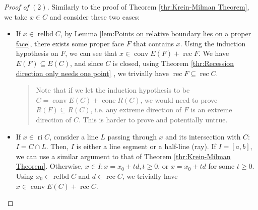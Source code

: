 \begin{proof}[Proof of \( (2) \)]
  Similarly to the proof of Theorem \ref{thr:Krein-Milman Theorem}, we take \( x
  \in C\) and consider these two cases:

  \begin{itemize}
  \item If \( x \in \operatorname{relbd} C \), by Lemma \ref{lem:Points on
    relative boundary lies on a proper face}, there exists some proper face \( F
    \) that contains \( x \). Using the induction hypothesis on \( F \), we
    can see that \( x \in \operatorname{conv} E(F) + \operatorname{rec} F
    \). We have \( E(F) \subseteq E(C) \), and since \( C \) is closed, using
    Theorem \ref{thr:Recession direction only needs one point} , we trivially
    have \( \operatorname{rec} F \subseteq \operatorname{rec} C \).

    \begin{quote}
      Note that if we let the induction hypothesis to be \( C =
      \operatorname{conv} E(C) + \operatorname{cone} R(C) \), we would need to
      prove \( R(F) \subseteq R(C) \), i.e. any extreme direction of \( F \) is
      an extreme direction of \( C \). This is harder to prove and potentially
      untrue.
    \end{quote}

  \item If \( x \in \operatorname{ri} C \), consider a line \( L \) passing
    through \( x \) and its intersection with \( C \): \( I = C \cap  L \).
    Then, \( I \) is either a line segment or a half-line (ray). If \( I = [a,
    b] \), we can use a similar argument to that of Theorem
    \ref{thr:Krein-Milman Theorem}. Otherwise, \( x \in I: x = x_{0} + t d, t
    \ge  0 \), or \( x = x_{0} + t d \) for some \( t \ge 0 \).
    Using \( x_{0} \in \operatorname{relbd} C \) and \( d \in \operatorname{rec} C
    \), we trivially have \( x \in \operatorname{conv} E(C) + \operatorname{rec}
    C\).
\end{itemize}
  
\end{proof}

